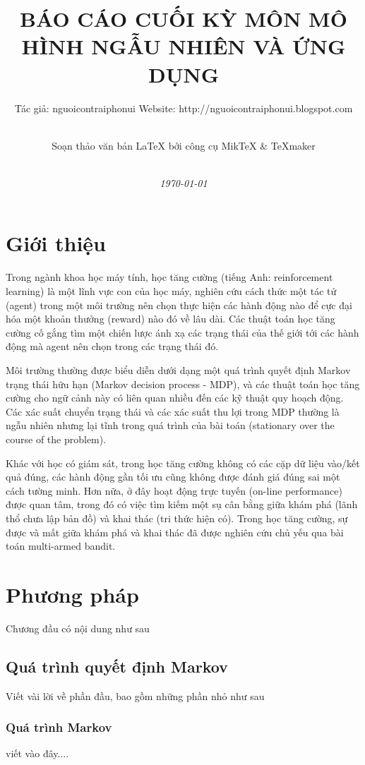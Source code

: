 \documentclass[14pt,a4paper,oneside]{report}		%
\title{{\bf  BÁO CÁO CUỐI KỲ MÔN MÔ HÌNH NGẪU NHIÊN VÀ ỨNG DỤNG}}
\author{Tác giả: nguoicontraiphonui \hspace*{1cm}Website: http://nguoicontraiphonui.blogspot.com \and \\
Soạn thảo văn bản \LaTeX{} bởi công cụ MikTeX $\&$ TeXmaker\\\\}
\date{{\em \today}}
\begin{document}
\pagestyle{fancy}	
\Large												%
\maketitle											%
\setlength{\baselineskip}{5truept}		%
\tableofcontents									%
\newpage
\setlength{\baselineskip}{18truept}	%
\chapter{Giới thiệu}
Trong ngành khoa học máy tính, học tăng cường (tiếng Anh: reinforcement learning) là một lĩnh vực con của học máy, nghiên cứu cách thức một tác tử (agent) trong một môi trường nên chọn thực hiện các hành động nào để cực đại hóa một khoản thưởng (reward) nào đó về lâu dài. Các thuật toán học tăng cường cố gắng tìm một chiến lược ánh xạ các trạng thái của thế giới tới các hành động mà agent nên chọn trong các trạng thái đó.

Môi trường thường được biểu diễn dưới dạng một quá trình quyết định Markov trạng thái hữu hạn (Markov decision process - MDP), và các thuật toán học tăng cường cho ngữ cảnh này có liên quan nhiều đến các kỹ thuật quy hoạch động. Các xác suất chuyển trạng thái và các xác suất thu lợi trong MDP thường là ngẫu nhiên nhưng lại tĩnh trong quá trình của bài toán (stationary over the course of the problem).

Khác với học có giám sát, trong học tăng cường không có các cặp dữ liệu vào/kết quả đúng, các hành động gần tối ưu cũng không được đánh giá đúng sai một cách tường minh. Hơn nữa, ở đây hoạt động trực tuyến (on-line performance) được quan tâm, trong đó có việc tìm kiếm một sụ cân bằng giữa khám phá (lãnh thổ chưa lập bản đồ) và khai thác (tri thức hiện có). Trong học tăng cường, sự được và mất giữa khám phá và khai thác đã được nghiên cứu chủ yếu qua bài toán multi-armed bandit.
\chapter{Phương pháp}
Chương đầu có nội dung như sau

\section{Quá trình quyết định Markov}
Viết vài lời về phần đầu, bao gồm những phần nhỏ như sau
\subsection{{\Large Quá trình Markov}}
viết vào đây....
\end{document}
